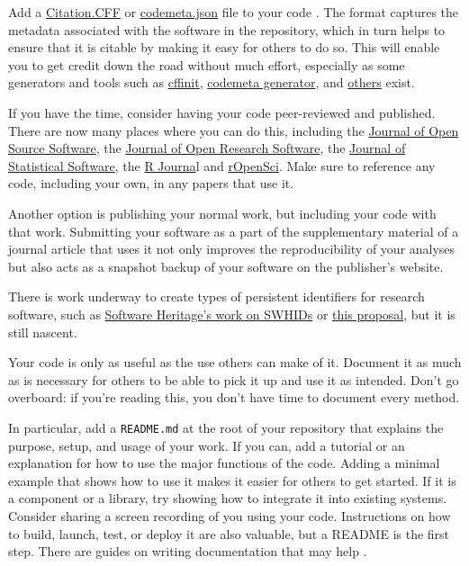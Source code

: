 \documentclass[10pt,letterpaper]{article}
\begin{document}
Add a \href{https://citation-file-format.github.io/}{Citation.CFF}
or \href{https://codemeta.github.io}{codemeta.json} file to your code \cite{Druskat2021}.
The format captures the metadata associated with the software in the repository,
which in turn helps to ensure that it is citable by making it easy for others to do so.
This will enable you to get credit down the road without much effort,
especially as some generators and tools
such as \href{https://citation-file-format.github.io/cff-initializer-javascript/}{cffinit},
\href{https://codemeta.github.io/codemeta-generator/}{codemeta generator},
and \href{https://github.com/citation-file-format/citation-file-format/blob/main/README.md\#tools-to-work-with-citationcff-files-wrench}{others} exist.

If you have the time,
consider having your code peer-reviewed and published.
There are now many places where you can do this,
including the \href{https://joss.theoj.org/}{Journal of Open Source Software},
the \href{https://openresearchsoftware.metajnl.com/}{Journal of Open Research Software},
the \href{http://www.jstatsoft.org}{Journal of Statistical Software},
the \href{https://journal.r-project.org/}{R Journa}l
and \href{https://ropensci.org/}{rOpenSci}.
Make sure to reference any code,
including your own,
in any papers that use it.

Another option is publishing your normal work,
but including your code with that work.
Submitting your software as a part of the supplementary material of a journal article that uses it
not only improves the reproducibility of your analyses
but also acts as a snapshot backup of your software on the publisher's website.

There is work underway to create types of persistent identifiers for research software,
such as \href{https://interoperable-europe.ec.europa.eu/collection/open-source-observatory-osor/news/swhid-intrinsic-identifier-software-artefacts}{Software Heritage's work on SWHIDs}
or \href{https://arxiv.org/abs/2501.10415}{this proposal},
but it is still nascent.

Your code is only as useful as the use others can make of it.
Document it as much as is necessary for others to be able to pick it up and use it as intended.
Don't go overboard:
if you're reading this,
you don't have time to document every method.

In particular,
add a \texttt{README.md} at the root of your repository
that explains the purpose, setup, and usage of your work.
If you can,
add a tutorial or an explanation for how to use the major functions of the code.
Adding a minimal example that shows how to use it makes it easier for others to get started.
If it is a component or a library,
try showing how to integrate it into existing systems.
Consider sharing a screen recording of you using your code.
Instructions on how to build,
launch, test, or deploy it are also valuable,
but a README is the first step.
There are guides on writing documentation that may help
\cite{Huybrechts2024,Littauer2025,Katz2025,Turing2025}.
\end{document}
